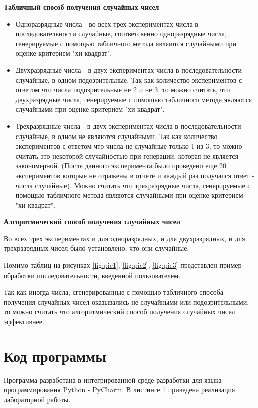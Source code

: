 \documentclass[14pt, a4paper]{extarticle}
\begin{document}
\textbf{Табличный способ получения случайных чисел}
\begin{itemize}
    \item Одноразрядные числа - во всех трех экспериментах числа в последовательности случайные, соответсвенно одноразрядные числа, генерируемые с помощью табличного метода являются случайными при оценке критерием "хи-квадрат".
    \item Двухразрядные числа - в двух экспериментах числа в последовательности случайные, в одном подозрительные. Так как количество экспериментов с ответом что числа подозрительные не 2 и не 3, то можно считать, что двухразрядные числа, генерируемые с помощью табличного метода являются случайными при оценке критерием "хи-квадрат".
    \item Трехразрядные числа - в двух экспериментах числа в последовательности случайные, в одном не являются случайными. Так как количество экспериментов с ответом что числа не случайные только 1 из 3, то можно считать это некоторой случайностью при генерации, которая не является закономерной. (После данного эксперимента было проведено еще 20 экспериментов которые не отражены в отчете и каждый раз получался ответ - числа случайные). Можно считать что трехразрядные числа, генерируемые с помощью табличного метода являются случайными при оценке критерием "хи-квадрат".
\end{itemize}

\textbf{Алгоритмический способ получения случайных чисел}

Во всех трех экспериментах и для одноразрядных, и для двухразрядных, и для трехразрядных чисел было установлено, что они случайные. 

Помимо таблиц на рисунках \ref{fig:pic1}, \ref{fig:pic2}, \ref{fig:pic3} представлен пример обработки последовательности, введенной пользователем. 

Так как иногда числа, сгенерированные с помощью табличного способа получения случайных чисел оказывались не случайными или подозрительными, то можно считать что алгоритмический способ получения случайных чисел эффективнее.

\section{Код программы}

Программа разработана в интегрированной среде разработки для языка программирования Python - PyCharm. 
В листинге 1 приведена реализация лабораторной работы.
\end{document}
